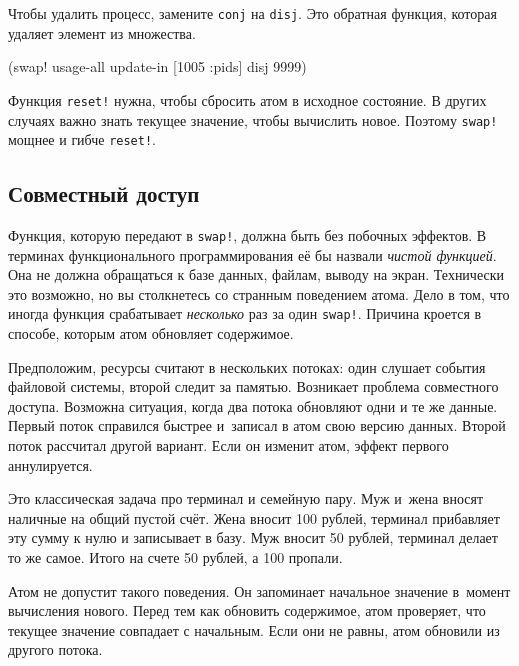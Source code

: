 \noindent
Чтобы удалить процесс, замените \verb|conj| на \verb|disj|. Это обратная
функция, которая удаляет элемент из множества.


\begin{english}
  \begin{clojure}
(swap! usage-all update-in [1005 :pids] disj 9999)
  \end{clojure}
\end{english}

Функция \verb|reset!| нужна, чтобы сбросить атом в исходное состояние. В
других случаях важно знать текущее значение, чтобы вычислить новое. Поэтому
\verb|swap!| мощнее и гибче \verb|reset!|.

\subsection{Совместный доступ}


Функция, которую передают в \verb|swap!|, должна быть без побочных эффектов. В
терминах функционального программирования её бы назвали \emph{чистой функцией}.
Она не должна обращаться к базе данных, файлам, выводу на экран. Технически
это возможно, но вы столкнетесь со странным поведением атома. Дело в том,
что иногда функция срабатывает \emph{несколько} раз за один \verb|swap!|.
Причина кроется в способе, которым атом обновляет содержимое.

Предположим, ресурсы считают в нескольких потоках: один слушает события файловой
системы, второй следит за памятью. Возникает проблема совместного
доступа. Возможна ситуация, когда два потока обновляют одни и те же
данные. Первый поток справился быстрее и~записал в атом свою версию
данных. Второй поток рассчитал другой вариант. Если он изменит атом, эффект
первого аннулируется.


Это классическая задача про терминал и семейную пару. Муж и~жена вносят наличные
на общий пустой счёт. Жена вносит 100 рублей, терминал прибавляет эту сумму к
нулю и записывает в базу. Муж вносит 50 рублей, терминал делает то же
самое. Итого на счете 50 рублей, а 100 пропали.

Атом не допустит такого поведения. Он запоминает начальное значение в~момент
вычисления нового. Перед тем как обновить содержимое, атом проверяет, что
текущее значение совпадает с начальным. Если они не равны, атом обновили из
другого потока.

